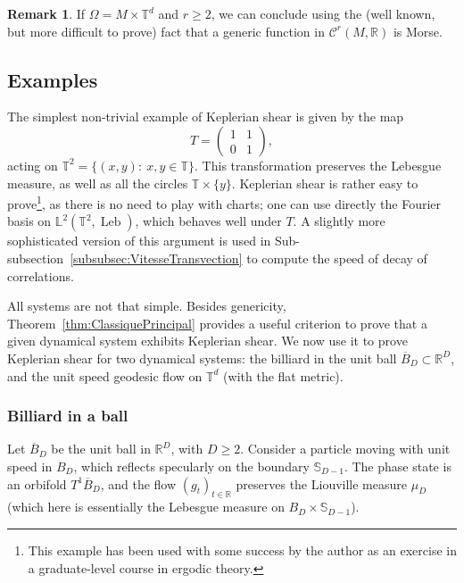 \documentclass[10pt]{amsart}
\theoremstyle{definition}\newtheorem{defi}[theo]{Definition}\newtheorem{rema}[theo]{Remark}\newtheorem{exam}[theo]{Example}\newtheorem{exem}[theo]{Example}\newtheorem{nota}[theo]{Notation}
\DeclareMathOperator{\Leb}{Leb}
\newcommand{\R}{\mathbb{R}}
\newcommand{\Lbb}{\mathbb{L}}
\newcommand{\Sbb}{\mathbb{S}}
\newcommand{\Tbb}{\mathbb{T}}
\newcommand{\Ccal}{\mathcal{C}}
\begin{document}
\begin{rema}
If $\Omega = M \times \Tbb^d$ and $r \geq 2$, we can conclude using the (well known, but more difficult to prove) fact that a generic function in $\Ccal^r (M, \R)$ is Morse.
\end{rema}


\subsection{Examples}\label{subsec:Exemples}

The simplest non-trivial example of Keplerian shear is given by the map
\[
T =
\begin{pmatrix}
1 & 1 \\
0 & 1
\end{pmatrix},
\]
acting on $\Tbb^2 = \{(x,y): \ x,y \in \Tbb\}$. This transformation preserves the Lebesgue measure, as well as all the circles $\Tbb \times \{y\}$. Keplerian shear is rather easy to prove\footnote{This example has been used with some success by the author as an exercise in a graduate-level course in ergodic theory.}, as there is no need to play with charts; one can use directly the Fourier basis on $\Lbb^2 (\Tbb^2, \Leb)$, which behaves well under $T$. A slightly more sophisticated version of this argument is used in Sub-subsection~\ref{subsubsec:VitesseTransvection} to compute the speed of decay of correlations.


All systems are not that simple. Besides genericity, Theorem~\ref{thm:ClassiquePrincipal} provides a useful criterion to prove that a given dynamical system exhibits Keplerian shear. We now use it to prove Keplerian shear for two dynamical systems: the billiard in the unit ball $\overline{B}_D \subset \R^D$, and the unit speed geodesic flow on $\Tbb^d$ (with the flat metric).


\subsubsection{Billiard in a ball}\label{subsubsec:Billard}

Let $\overline{B}_D$ be the unit ball in $\R^D$, with $D \geq 2$. Consider a particle moving with unit speed in $B_D$, which reflects specularly on the boundary $\Sbb_{D-1}$. The phase state is an orbifold $T^1 \overline{B}_D$, and the flow $(g_t)_{t \in \R}$ preserves the Liouville measure $\mu_D$ (which here is essentially the Lebesgue measure on $B_D \times \Sbb_{D-1}$).
\end{document}
